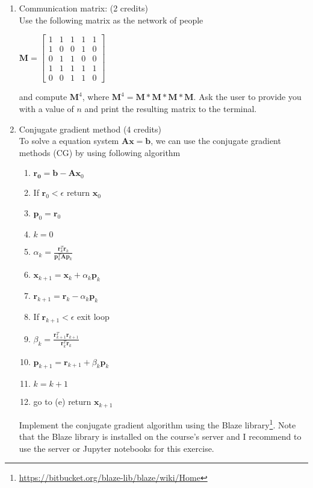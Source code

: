 \documentclass[11pt]{article}
\begin{document}
\begin{enumerate}

\item Communication matrix: (2 credits)\\
Use the following matrix as the network of people
\begin{center}
$
\mathbf{M} = \left[\begin{matrix}
1 & 1 & 1 & 1 & 1 \\
1 & 0 & 0 & 1 & 0 \\
0 & 1 & 1 & 0 & 0 \\
1 & 1 & 1 & 1 & 1 \\
0 & 0 & 1 & 1 & 0
\end{matrix}\right]
$
\end{center}
and compute $\mathbf{M}^4$, where $\mathbf{M}^4= \mathbf{M}*\mathbf{M}*\mathbf{M}*\mathbf{M}$. Ask the user to provide you with a value of $n$ and print the resulting matrix to the terminal.

\item Conjugate gradient method (4 credits)\\
To solve a equation system $\mathbf{A}\mathbf{x}=\mathbf{b}$, we can use the conjugate gradient methods (CG) by using following algorithm
\begin{enumerate}
\item $\mathbf{r_0} = \mathbf{b} - \mathbf{A} \mathbf{x}_0$
\item If $\mathbf{r}_0< \epsilon$ return  $\mathbf{x}_0$
\item $\mathbf{p}_0=\mathbf{r}_0$
\item $k=0$
\item $\alpha_k = \frac{\mathbf{r}_k^T\mathbf{r}_k}{\mathbf{p}_k^T\mathbf{A}\mathbf{p}_k}$
\item $ \mathbf{x}_{k+1} = \mathbf{x}_k + \alpha_k \mathbf{p}_k$
\item $ \mathbf{r}_{k+1} = \mathbf{r}_k - \alpha_k \mathbf{p}_k$
\item If $\mathbf{r}_{k+1}< \epsilon$ exit loop
\item $\beta_k = \frac{\mathbf{r}_{k+1}^T\mathbf{r}_{k+1}}{\mathbf{r}_k^T\mathbf{r}_k}$
\item $\mathbf{p}_{k+1}=\mathbf{r}_{k+1} + \beta_k \mathbf{p}_k$
\item $k=k+1$
\item go to (e)
return $\mathbf{x}_{k+1}$
\end{enumerate}
Implement the conjugate gradient algorithm using the Blaze library\footnote{\url{https://bitbucket.org/blaze-lib/blaze/wiki/Home}}. Note that the Blaze library is installed on the course's server and I recommend to use the server or Jupyter notebooks for this exercise.


\end{enumerate}
\end{document}
